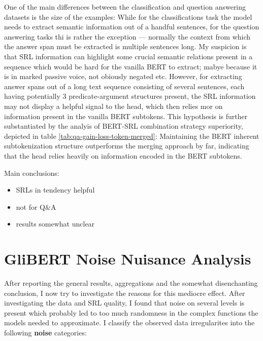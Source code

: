 One of the main differences between the classification and question answering datasets is the size of
the examples: While for the classifications task the model needs to extract semantic
information out of a handful sentences, for the question answering tasks thi is rather the exception ---
normally the context from which the answer span must be extracted is multiple sentences long. My suspicion
is that SRL information can highlight some crucial semantic relations present in a sequence which would be
hard for the vanilla BERT to extract; mabye because it is in marked passive voice, not obiously negated etc.
However, for extracting answer spans out of a long text sequence consisting of several sentences, each having
potentially 3 predicate-argument structures present, the SRL information may not display a helpful signal to the
head, which then relies mor on information present in the vanilla BERT subtokens. This hypothesis is further
substantiated by the analyis of BERT-SRL combination strategy superiority, depicted in table \ref{tab:qa-gain-loss-token-merged}:
Maintaining the BERT inherent subtokenization structure outperforms the merging approach by far, indicating that
the head relies heavily on information encoded in the BERT subtokens.






Main conclusions:

\begin{itemize}
  \item SRLs in tendency helpful
  \item not for Q\&A
  \item results somewhat unclear
\end{itemize}


\section{GliBERT Noise Nuisance Analysis}
\label{sec:glinoise}


After reporting the general results, aggregations and the somewhat disenchanting conclusion, I
now try to investigate the reasons for this mediocre effect. After investigating the data and
SRL quality, I found that noise on several levels is present which probably led to too much
randomness in the complex functions the models needed to approximate. I classify the observed
data irregularites into the following \textbf{noise} categories:


